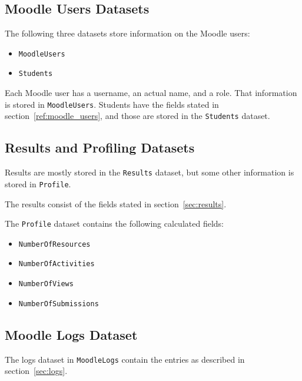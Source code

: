 \subsection{Moodle Users Datasets}

The following three datasets store information on the Moodle users:

\begin{itemize}
    \item \texttt{MoodleUsers}
    \item \texttt{Students}
\end{itemize}

Each Moodle user has a username, an actual name, and a role. That information
is stored in \texttt{MoodleUsers}. Students have the fields stated in
section~\ref{ref:moodle_users}, and those are stored in the \texttt{Students}
dataset.

\subsection{Results and Profiling Datasets}

Results are mostly stored in the \texttt{Results} dataset, but some other
information is stored in \texttt{Profile}.

The results consist of the fields stated in section~\ref{sec:results}.

The \texttt{Profile} dataset contains the following calculated fields:

\begin{itemize}
    \item \texttt{NumberOfResources}
    \item \texttt{NumberOfActivities}
    \item \texttt{NumberOfViews}
    \item \texttt{NumberOfSubmissions}
\end{itemize}

\subsection{Moodle Logs Dataset}

The logs dataset in \texttt{MoodleLogs} contain the entries as described in
section~\ref{sec:logs}.
